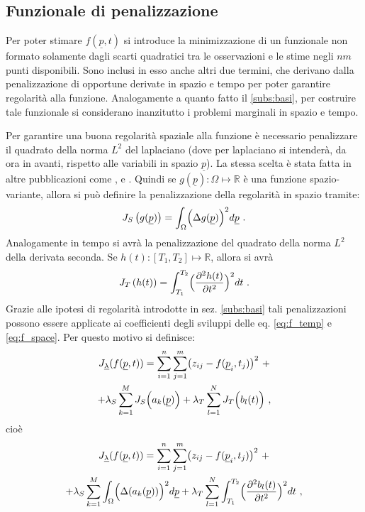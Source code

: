 \documentclass[a4paper,11pt,twoside,openright]{book}							%
\begin{document}
\subsection{Funzionale di penalizzazione}

Per poter stimare $f(\underline p,t)$ si introduce la minimizzazione di un funzionale non formato solamente dagli scarti quadratici tra le osservazioni e le stime negli $nm$ punti disponibili. Sono inclusi in esso anche altri due termini, che derivano dalla penalizzazione di opportune derivate in spazio e tempo per poter garantire regolarità alla funzione. Analogamente a quanto fatto il \ref{subs:basi}, per costruire tale funzionale si considerano inanzitutto i problemi marginali in spazio e tempo.

Per garantire una buona regolarità spaziale alla funzione è necessario penalizzare il quadrato della norma $L^2$ del laplaciano (dove per laplaciano si intenderà, da ora in avanti, rispetto alle variabili in spazio $\underline p$). La stessa scelta è stata fatta in altre pubblicazioni come \cite{art:ramsay}, \cite{art:sangalli} e \cite{art:wood}. Quindi se $g(\underline p): \Omega \mapsto \mathbb{R}$ è una funzione spazio-variante, allora si può definire la penalizzazione della regolarità in spazio tramite:
$$
J_S\left(g(\underline p)\right)=\int_{\Omega} \Bigl( \Delta  g(\underline p  ) \Bigr)^2 d \underline p \ .
$$
Analogamente in tempo si avrà la penalizzazione del quadrato della norma $L^2$ della derivata seconda. Se $h(t): [T_1,T_2] \mapsto \mathbb{R}$, allora si avrà
$$
J_T\left(h(t)\right)=\int_{T_1}^{T_2} \Bigl( \frac{\partial^2   h(t)   }{\partial t ^2} \Bigr)^2 dt\ .
$$
Grazie alle ipotesi di regolarità introdotte in sez. \ref{subs:basi} tali penalizzazioni possono essere applicate ai coefficienti degli sviluppi delle eq. \ref{eq:f_temp} e \ref{eq:f_space}. Per questo motivo si definisce:
\begin{multline*}
J_{\underline \lambda }(f(\underline p,t))=\sum_{i=1}^n \sum_{j=1}^m \bigl( z_{ij} - f(\underline p_i,t_j) \bigr)^2 \ + \\
+\lambda_S  \sum_{k=1}^M J_S\Bigl( a_k(\underline p)\Bigr) + \lambda_T \sum_{l=1}^N J_T \Bigl( b_l(t)\Bigr) \ ,
\end{multline*}
cioè
\begin{multline}
\label{eq:penalizzdisc}
J_{\underline \lambda }(f(\underline p,t))=\sum_{i=1}^n \sum_{j=1}^m \bigl( z_{ij} - f(\underline p_i,t_j) \bigr)^2 \ + \\
+\lambda_S  \sum_{k=1}^M \int_{\Omega} \Bigl( \Delta(  a_k(\underline p)  ) \Bigr)^2 d \underline p + \lambda_T \sum_{l=1}^N\int_{T_1}^{T_2} \Bigl( \frac{\partial^2   b_l(t)   }{\partial t ^2} \Bigr)^2 dt \ ,
\end{multline}
\end{document}
